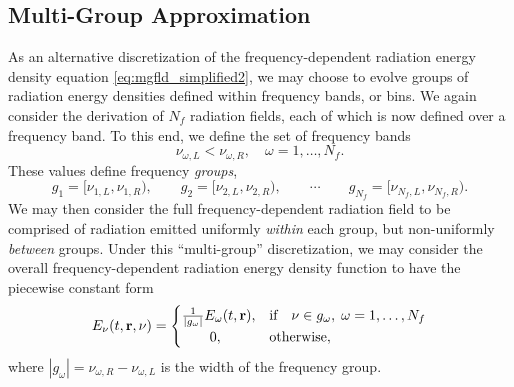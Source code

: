 \documentclass[10pt]{article}
\renewcommand{\(}{\left(}
\renewcommand{\)}{\right)}
\newcommand{\rvec}{{\bf r}}
\newcommand{\Enu}{E_{\nu}}
\begin{document}
\subsection{Multi-Group Approximation}
\label{subsec:multi_group}

As an alternative discretization of the frequency-dependent radiation
energy density equation \eqref{eq:mgfld_simplified2}, we may choose to
evolve groups of radiation energy densities defined within frequency
bands, or bins.  We again consider the derivation of $N_f$ radiation
fields, each of which is now defined over a frequency band.  To this
end, we define the set of frequency bands
\begin{equation}
\label{eq:bin_bounds}
  \nu_{\omega,L} < \nu_{\omega,R},\quad \omega=1,\ldots,N_f.
\end{equation}
These values define frequency {\em groups}, 
\begin{equation}
\label{eq:frequency_groups}
  g_1 = [\nu_{1,L},\nu_{1,R}), \qquad   g_2 = [\nu_{2,L},\nu_{2,R}), 
  \qquad \cdots \qquad
  g_{N_f} = [\nu_{N_f,L},\nu_{N_f,R}).
\end{equation}
We may then consider the full frequency-dependent radiation field to
be comprised of radiation emitted uniformly {\em within} each group,
but non-uniformly {\em between} groups.  Under this ``multi-group''
discretization, we may consider the overall frequency-dependent
radiation energy density function to have the piecewise constant form  
\begin{equation}
\label{eq:multigroup_radiation}
  \Enu(t,\rvec,\nu) = \begin{cases}
    \frac{1}{|g_{\omega}|}E_{\omega}(t,\rvec), & 
    \text{if}\quad \nu \in g_{\omega}, \; \omega=1,\ldots,N_f\\
    \qquad 0, & \text{otherwise},
  \end{cases}
\end{equation}
where $|g_{\omega}| = \nu_{\omega,R}-\nu_{\omega,L}$ is the width of
the frequency group.
\end{document}

